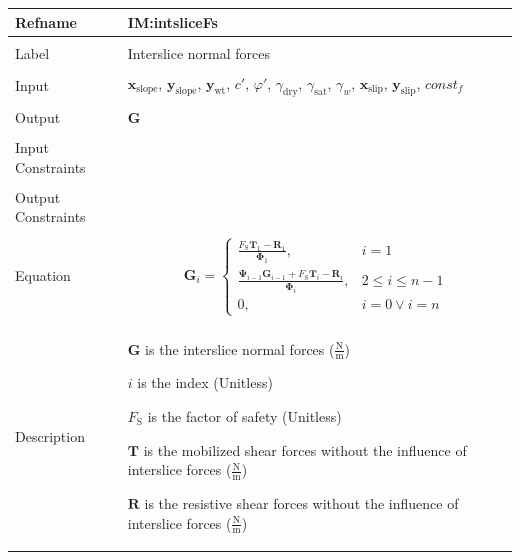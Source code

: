\documentclass[12pt]{article}
\begin{document}
\noindent \begin{minipage}{\textwidth}
\begin{tabular}{>{\raggedright}p{}>{\raggedright\arraybackslash}p{}}
\toprule \textbf{Refname} & \textbf{IM:intsliceFs}
\label{IM:intsliceFs}
\\ \midrule \\
Label & Interslice normal forces
\\ \midrule \\
Input & ${\mathbf{x}_{\text{slope}}}$, ${\mathbf{y}_{\text{slope}}}$, ${\mathbf{y}_{\text{wt}}}$, $c'$, $φ'$, ${γ_{\text{dry}}}$, ${γ_{\text{sat}}}$, ${γ_{w}}$, ${\mathbf{x}_{\text{slip}}}$, ${\mathbf{y}_{\text{slip}}}$, $const_f$
\\ \midrule \\
Output & $\mathbf{G}$
\\ \midrule \\
Input Constraints & 
\\ \midrule \\
Output Constraints & 
\\ \midrule \\
Equation & \begin{displaymath}
           {\mathbf{G}}_{i}=\begin{cases}
                            \frac{{F_{\text{S}}} {\mathbf{T}}_{1}-{\mathbf{R}}_{1}}{{\mathbf{Φ}}_{1}}, & i=1\\
\frac{{\mathbf{Ψ}}_{i-1} {\mathbf{G}}_{i-1}+{F_{\text{S}}} {\mathbf{T}}_{i}-{\mathbf{R}}_{i}}{{\mathbf{Φ}}_{i}}, & 2\leq{}i\leq{}n-1\\
0, & i=0\lor{}i=n
                            \end{cases}
           \end{displaymath}
\\ \midrule \\
Description & \begin{symbDescription}
              \item{$\mathbf{G}$ is the interslice normal forces ($\frac{\text{N}}{\text{m}}$)}
              \item{$i$ is the index (Unitless)}
              \item{${F_{\text{S}}}$ is the factor of safety (Unitless)}
              \item{$\mathbf{T}$ is the mobilized shear forces without the influence of interslice forces ($\frac{\text{N}}{\text{m}}$)}
              \item{$\mathbf{R}$ is the resistive shear forces without the influence of interslice forces ($\frac{\text{N}}{\text{m}}$)}

\end{symbDescription}
\end{tabular}
\end{minipage}
\end{document}
